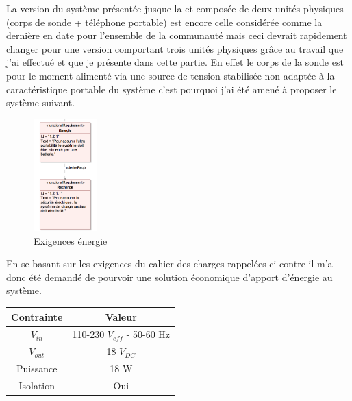 \documentclass[12pt]{article}
\begin{document}
La version du système présentée jusque la et composée de deux unités physiques (corps de sonde + téléphone portable) est encore celle considérée comme la dernière en date pour l'ensemble de la communauté mais ceci devrait rapidement changer pour une version comportant trois unités physiques grâce au travail que j'ai effectué et que je présente dans cette partie. En effet le corps de la sonde est pour le moment alimenté via une source de tension stabilisée non adaptée à la caractéristique portable du système c'est pourquoi j'ai été amené à proposer le système suivant.\par

\vspace{20pt}
\begin{figure}
  \vspace{-40pt}
  \hspace{-0pt}
  \begin{center}
    \includegraphics[width=0.22\textwidth]{Images_Rapport/portabilites}
  \end{center}
  \vspace{-5pt}
  \caption{Exigences énergie}
  \vspace{-10pt}
\end{figure}

En se basant sur les exigences du cahier des charges rappelées ci-contre il m'a donc été demandé de pourvoir une solution économique d'apport d'énergie au système.\par
\vspace{10pt}
\begin{tabular}{|c|c|}
  \hline
  Contrainte & Valeur  \\
  \hline
  $V_{in}$ & 110-230 $V_{eff}$ - 50-60 Hz \\ \hline
  $V_{out}$ & 18 $V_{DC}$  \\
  \hline
  Puissance & 18 W \\ \hline
  Isolation & Oui  \\
  \hline
 
 
\end{tabular}
\vspace{100pt}
\end{document}
